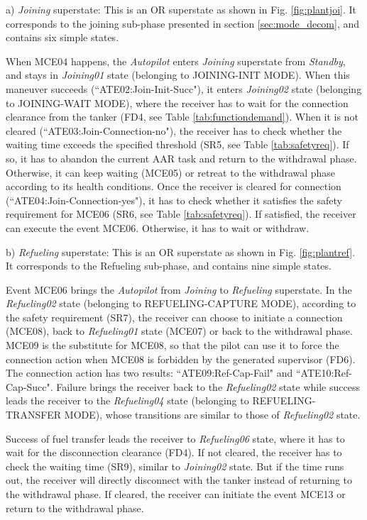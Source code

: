 a) \textit{Joining} superstate:
This is an OR superstate as shown in Fig. \ref{fig:plantjoi}. It corresponds to the joining sub-phase presented in section \ref{sec:mode_decom}, and contains six simple states.

When MCE04 happens, the \textit{Autopilot} enters \textit{Joining} superstate from \textit{Standby}, and stays in \textit{Joining01} state (belonging to JOINING-INIT MODE). When this maneuver succeeds (``ATE02:Join-Init-Succ"), it enters \textit{Joining02} state (belonging to JOINING-WAIT MODE), where the receiver has to wait for the connection clearance from the tanker (FD4, see Table \ref{tab:functiondemand}). When it is not cleared (``ATE03:Join-Connection-no"), the receiver has to check whether the waiting time exceeds the specified threshold (SR5, see Table \ref{tab:safetyreq}). If so, it has to abandon the current AAR task and return to the withdrawal phase. Otherwise, it can keep waiting (MCE05)  or retreat to the withdrawal phase according to its health conditions. Once the receiver is cleared for connection (``ATE04:Join-Connection-yes"), it has to check whether it satisfies the safety requirement for MCE06 (SR6, see Table \ref{tab:safetyreq}). If  satisfied, the receiver can execute the event MCE06. Otherwise, it has to wait or withdraw. 



b) \textit{Refueling} superstate: This is an OR superstate as shown in Fig. \ref{fig:plantref}. It corresponds to the Refueling sub-phase, and contains nine simple states. 

Event MCE06 brings the \textit{Autopilot} from \textit{Joining} to \textit{Refueling} superstate. In the \textit{Refueling02} state (belonging to REFUELING-CAPTURE MODE), according to the safety requirement (SR7), the receiver can choose to initiate a connection (MCE08), back to \textit{Refueling01} state (MCE07) or back to the withdrawal phase. MCE09 is the substitute for MCE08, so that the pilot can use it to force the connection action when MCE08 is forbidden by the generated supervisor (FD6). The connection action has two results: ``ATE09:Ref-Cap-Fail" and ``ATE10:Ref-Cap-Succ". Failure brings the receiver back to the  \textit{Refueling02} state while success leads the receiver to the \textit{Refueling04} state (belonging to REFUELING-TRANSFER MODE), whose transitions are similar to those of \textit{Refueling02} state.	

Success of fuel transfer leads the receiver to \textit{Refueling06} state, where it has to wait for the disconnection clearance (FD4). If not cleared, the receiver has to check the waiting time (SR9), similar to \textit{Joining02} state. But if the time runs out, the receiver will directly disconnect with the tanker instead of returning to the withdrawal phase. If cleared, the receiver can initiate the event MCE13 or return to the withdrawal phase.

